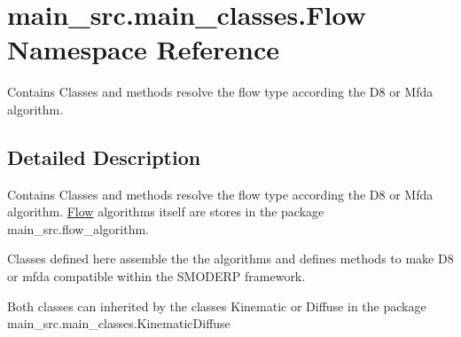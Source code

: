 \hypertarget{namespacemain__src_1_1main__classes_1_1Flow}{\section{main\-\_\-src.\-main\-\_\-classes.\-Flow Namespace Reference}
\label{namespacemain__src_1_1main__classes_1_1Flow}
}


Contains Classes and methods resolve the flow type according the D8 or Mfda algorithm.  




\subsection{Detailed Description}
Contains Classes and methods resolve the flow type according the D8 or Mfda algorithm. \hyperlink{namespacemain__src_1_1main__classes_1_1Flow}{Flow} algorithms itself are stores in the package main\-\_\-src.\-flow\-\_\-algorithm.

Classes defined here assemble the the algorithms and defines methods to make D8 or mfda compatible within the S\-M\-O\-D\-E\-R\-P framework.

Both classes can inherited by the classes Kinematic or Diffuse in the package main\-\_\-src.\-main\-\_\-classes.\-Kinematic\-Diffuse 